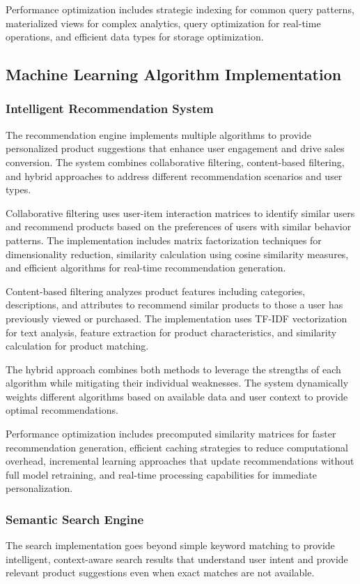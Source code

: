 \documentclass[12pt]{article}
\begin{document}
Performance optimization includes strategic indexing for common query patterns, materialized views for complex analytics, query optimization for real-time operations, and efficient data types for storage optimization.

\subsection{Machine Learning Algorithm Implementation}

\subsubsection{Intelligent Recommendation System}
The recommendation engine implements multiple algorithms to provide personalized product suggestions that enhance user engagement and drive sales conversion. The system combines collaborative filtering, content-based filtering, and hybrid approaches to address different recommendation scenarios and user types.

Collaborative filtering uses user-item interaction matrices to identify similar users and recommend products based on the preferences of users with similar behavior patterns. The implementation includes matrix factorization techniques for dimensionality reduction, similarity calculation using cosine similarity measures, and efficient algorithms for real-time recommendation generation.

Content-based filtering analyzes product features including categories, descriptions, and attributes to recommend similar products to those a user has previously viewed or purchased. The implementation uses TF-IDF vectorization for text analysis, feature extraction for product characteristics, and similarity calculation for product matching.

The hybrid approach combines both methods to leverage the strengths of each algorithm while mitigating their individual weaknesses. The system dynamically weights different algorithms based on available data and user context to provide optimal recommendations.

Performance optimization includes precomputed similarity matrices for faster recommendation generation, efficient caching strategies to reduce computational overhead, incremental learning approaches that update recommendations without full model retraining, and real-time processing capabilities for immediate personalization.

\subsubsection{Semantic Search Engine}
The search implementation goes beyond simple keyword matching to provide intelligent, context-aware search results that understand user intent and provide relevant product suggestions even when exact matches are not available.
\end{document}
